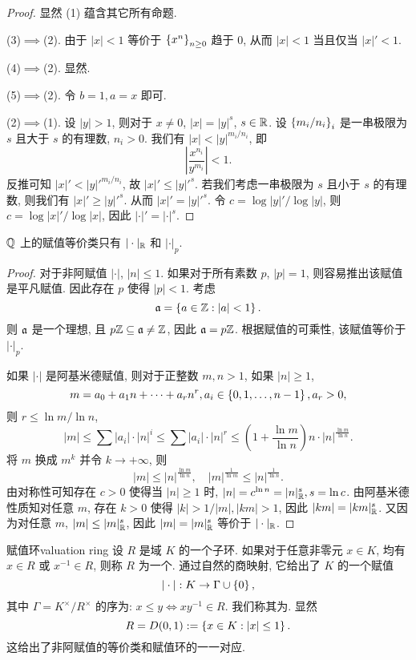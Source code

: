 \begin{proof}
显然 (1) 蕴含其它所有命题.

(3)$\implies$(2). 由于 $|x|<1$ 等价于 $\left\{x^n\right\}_{n\ge 0}$ 趋于 $0$, 从而 $|x|<1$ 当且仅当 $|x|'<1$. 

(4)$\implies$(2). 显然.

(5)$\implies$(2). 令 $b=1,a=x$ 即可.

(2)$\implies$(1). 设 $|y|>1$, 则对于 $x\neq 0$, $|x|=|y|^s$, $s\in{\mathbb{R}}$. 设 $\left\{m_i/n_i\right\}_i$ 是一串极限为 $s$ 且大于 $s$ 的有理数, $n_i>0$. 我们有 $|x|<|y|^{m_i/n_i}$, 即
	\[\left|\frac{x^{n_i}}{y^{m_i}}\right|<1.\]
反推可知 $|x|'<{|y|'}^{m_i/n_i}$, 故 $|x|'\le {|y|'}^s$. 若我们考虑一串极限为 $s$ 且小于 $s$ 的有理数, 则我们有 $|x|'\ge {|y|'}^s$. 从而 $|x|'={|y|'}^s$. 令 $c=\log|y|'/\log|y|$, 则 $c=\log|x|'/\log|x|$, 因此 $|\cdot|'=|\cdot|^s$.
\end{proof}


\begin{theorem}{}{}
${\mathbb{Q}}$ 上的赋值等价类只有 $|\cdot|_{\mathbb{R}}$ 和 $|\cdot|_p$.
\end{theorem}
\begin{proof}
对于非阿赋值 $|\cdot|$, $|n|\le 1$. 如果对于所有素数 $p$, $|p|=1$, 则容易推出该赋值是平凡赋值. 因此存在 $p$ 使得 $|p|<1$. 考虑
  \[{\mathfrak{a}}=\left\{a\in{\mathbb{Z}}: |a|<1\right\}.\]
则 ${\mathfrak{a}}$ 是一个理想, 且 $p{\mathbb{Z}}\subseteq {\mathfrak{a}}\neq {\mathbb{Z}}$, 因此 ${\mathfrak{a}}=p{\mathbb{Z}}$. 根据赋值的可乘性, 该赋值等价于 $|\cdot|_p$.

如果 $|\cdot|$ 是阿基米德赋值, 则对于正整数 $m,n>1$, 如果 $|n|\ge 1$,
  \[m=a_0+a_1 n+\dots+a_r n^r, a_i\in\left\{0,1,\dots,n-1\right\},a_r>0,\]
则 $r\le \ln m/\ln n$,
  \[|m|\le \sum |a_i|\cdot |n|^i\le \sum |a_i|\cdot |n|^r\le \left(1+\frac{\ln m}{\ln n}\right) n\cdot|n|^{\frac{\ln m}{\ln n}}.\]
将 $m$ 换成 $m^k$ 并令 $k\to +\infty$, 则
  \[|m|\le |n|^{\frac{\ln m}{\ln n}},\quad |m|^{\frac{1}{\ln m}}\le |n|^{\frac{1}{\ln n}}.\]
由对称性可知存在 $c>0$ 使得当 $|n|\ge 1$ 时, $|n|=c^{\ln n}=|n|_{\mathbb{R}}^s,s=\ln c$.
由阿基米德性质知对任意 $m$, 存在 $k>0$ 使得 $|k|>1/|m|, |km|>1$, 因此 $|km|=|km|_{\mathbb{R}}^s$. 又因为对任意 $m$, $|m|\le |m|_{\mathbb{R}}^s$, 因此 $|m|=|m|_{\mathbb{R}}^s$ 等价于 $|\cdot|_{\mathbb{R}}$.
\end{proof}

\begin{definition}{赋值环}{valuation ring}
设 $R$ 是域 $K$ 的一个子环. 如果对于任意非零元 $x\in K$, 均有 $x\in R$ 或 $x^{-1}\in R$, 则称 $R$ 为一个. 通过自然的商映射, 它给出了 $K$ 的一个赋值
  \[|\cdot|: K\to \Gamma\cup\left\{0\right\},\]
其中 $\Gamma= K^\times/R^\times$ 的序为: $x\le y\iff xy^{-1}\in R$. 我们称其为. 显然
  \[R=D(0,1):=\left\{x\in K: |x|\le 1\right\}.\]
这给出了非阿赋值的等价类和赋值环的一一对应.
\end{definition}

